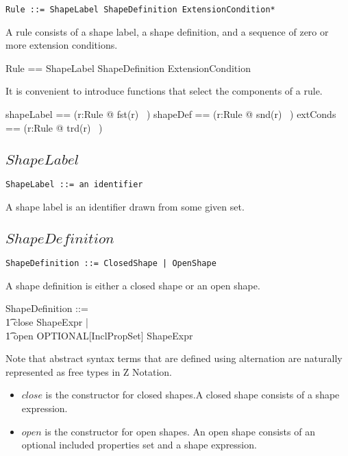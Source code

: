 \documentclass{article}
\begin{document}
\begin{verbatim}
Rule ::= ShapeLabel ShapeDefinition ExtensionCondition*
\end{verbatim}

A rule consists of a shape label, a shape definition, and a sequence of zero or more extension conditions.
\begin{zed}
	Rule == ShapeLabel \cross ShapeDefinition \cross \seq ExtensionCondition
\end{zed}

It is convenient to introduce functions that select the components of a rule.
\begin{zed}
	shapeLabel == (\lambda r:Rule @ fst(r) ~)
\also
	shapeDef == (\lambda r:Rule @ snd(r) ~)
\also
	extConds == (\lambda r:Rule @ trd(r) ~)
\end{zed}

\subsection{$ShapeLabel$}

\begin{verbatim}
ShapeLabel ::= an identifier
\end{verbatim}

A shape label is an identifier drawn from some given set.
\begin{zed}
	[ShapeLabel]
\end{zed}

\subsection{$ShapeDefinition$}

\begin{verbatim}
ShapeDefinition ::= ClosedShape | OpenShape
\end{verbatim}

A shape definition is either a closed shape or an open shape.
\begin{zed}
	ShapeDefinition ::= \\
\t1		close \ldata ShapeExpr \rdata | \\
\t1		open \ldata OPTIONAL[InclPropSet] \cross ShapeExpr \rdata
\end{zed}
Note that abstract syntax terms that are defined using alternation are naturally represented as free types in Z Notation.
\begin{itemize}
\item $close$ is the constructor for closed shapes.A closed shape consists of a shape expression.
\item $open$ is the constructor for open shapes. An open shape consists of an optional included properties set and a shape expression.
\end{itemize}
\end{document}
